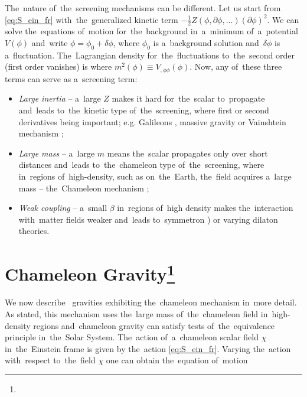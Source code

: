 The~nature of~the~screening mechanisms can be different. Let us start from \eqref{eq:S_ein_fr} with~the~generalized kinetic term $-\frac12 Z(\phi,\partial\phi,...)(\partial\phi)^2$. We can solve the~equations of~motion for~the~background in~a~minimum of~a~potential $V(\phi)$ and~write $\phi=\phi_0+\delta\phi$, where $\phi_0$ is a~background solution and~$\delta\phi$ is a~fluctuation. The~Lagrangian density for~the~fluctuations to~the~second order (first order vanishes) is
where $m^2(\phi)\equiv V_{,\phi\phi}(\phi)$. Now, any of~these three terms can serve as a~screening term:
\begin{itemize}
	\item  \textit{Large inertia} -- a~large $Z$ makes it hard for~the~scalar to~propagate and~leads to~the~kinetic type of~the~screening, where first or second derivatives being important; e.g. Galileons \parencite{2009PhRvD..79f4036N}, massive gravity \parencite{2012RvMP...84..671H} or Vainshtein mechanism \parencite{2013CQGra..30r4001B};
	\item \textit{Large mass} --  a~large $m$ means the~scalar propagates only over short distances and~leads to~the~chameleon type of~the~screening, where in~regions of~high-density, such as on~the~Earth, the~field acquires a~large mass -- the~Chameleon mechanism \parencite{Waterhouse:2006wv};
	\item \textit{Weak coupling} -- a~small $\beta$ in~regions of~high density makes the~interaction with~matter fields weaker and~leads to~symmetron \parencite{2010PhRvL.104w1301H}) or varying dilaton \parencite{Damour:1994zq,2011PhRvD..83j4026B} theories.
\end{itemize} 
\DIFdelbegin %
\DIFdelend \DIFaddbegin \section[Chameleon Gravity]{\DIFaddend Chameleon Gravity\DIFaddbegin \footnote{}\DIFaddend }
\label{sec_cham}
We now describe \fR\ gravities exhibiting the~chameleon mechanism in~more detail. As stated, this mechanism uses the~large mass of~the~chameleon field in~high-density regions and~chameleon gravity can satisfy tests of~the~equivalence principle in~the~Solar System. The~action of~a~chameleon scalar field $\chi$ in~the~Einstein frame is given by the~action \eqref{eq:S_ein_fr}. Varying the~action with~respect to~the~field $\chi$ one can obtain the~equation of~motion
